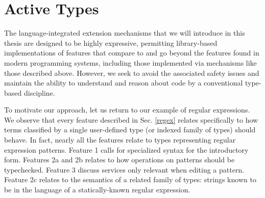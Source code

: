 \section{Active Types}\label{contributions}
The language-integrated extension mechanisms that we will introduce in this thesis are designed to be highly {expressive}, permitting library-based implementations of features that compare to and go beyond the features found in modern programming systems, including those implemented via mechanisms like those described above. However, we seek to avoid the associated {safety} issues and  maintain the ability to understand and reason about code by a conventional type-based discipline. %

To motivate our approach, let us return to our example of regular expressions. We observe that every feature described in Sec. \ref{regex} relates specifically to how terms  classified by a single user-defined type (or indexed family of types) should behave. In fact, nearly all the features relate to types representing regular expression patterns. Feature 1 calls for specialized syntax for the introductory form. Features 2a and 2b relates to how operations on patterns should be typechecked. Feature 3 discuss services only relevant when editing a pattern. Feature 2c relates to the semantics of a related  family of types: strings known to be in the language of a statically-known regular expression. %

